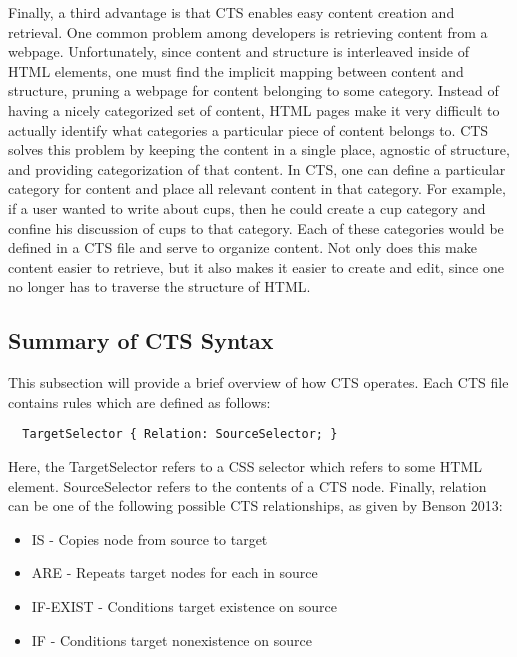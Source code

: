 \documentclass[12pt]{article}
\begin{document}
Finally, a third advantage is that CTS enables easy content creation and retrieval. One common problem among developers is retrieving content from a webpage. Unfortunately, since content and structure is interleaved inside of HTML elements, one must find the implicit mapping between content and structure, pruning a webpage for content belonging to some category. Instead of having a nicely categorized set of content, HTML pages make it very difficult to actually identify what categories a particular piece of content belongs to. CTS solves this problem by keeping the content in a single place, agnostic of structure, and providing categorization of that content. In CTS, one can define a particular category for content and place all relevant content in that category. For example, if a user wanted to write about cups, then he could create a cup category and confine his discussion of cups to that category. Each of these categories would be defined in a CTS file and serve to organize content. Not only does this make content easier to retrieve, but it also makes it easier to create and edit, since one no longer has to traverse the structure of HTML.

\subsection{Summary of CTS Syntax}

This subsection will provide a brief overview of how CTS operates. Each CTS file contains rules which are defined as follows:

\begin{lstlisting}
  TargetSelector { Relation: SourceSelector; }
\end{lstlisting}

Here, the TargetSelector refers to a CSS selector which refers to some HTML element. SourceSelector refers to the contents of a CTS node. Finally, relation can be one of the following possible CTS relationships, as given by Benson 2013:

\begin{itemize}
  \item IS - Copies node from source to target
  \item ARE - Repeats target nodes for each in source
  \item IF-EXIST - Conditions target existence on source
  \item IF - Conditions target nonexistence on source
\end{itemize}
\end{document}
